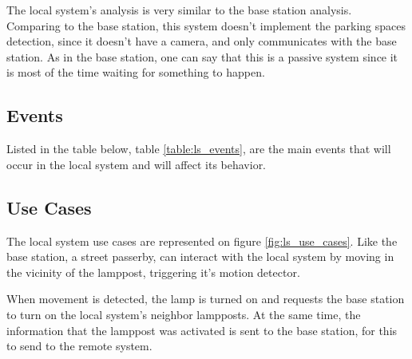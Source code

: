 The local system's analysis is very similar to the base station analysis. Comparing to the base station, this system doesn't implement the parking spaces detection, since it doesn't have a camera, and only communicates with the base station. As in the base station, one can say that this is a passive system since it is most of the time waiting for something to happen.

\subsection{Events}
Listed in the table below, table \ref{table:ls_events}, are the main events that will occur in the local system and will affect its behavior. 

\begin{table}[h]
	\centering
	
	\caption{Local system events.}
	\label{table:ls_events}
\end{table}

\subsection{Use Cases}
The local system use cases are represented on figure \ref{fig:ls_use_cases}. Like the base station, a street passerby, can interact with the local system by moving in the vicinity of the lamppost, triggering it's motion detector.

When movement is detected, the lamp is turned on and requests the base station to turn on the local system's neighbor lampposts. At the same time, the information that the lamppost was activated is sent to the base station, for this to send to the remote system.


